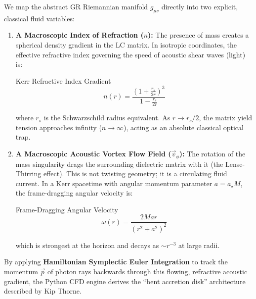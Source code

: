We map the abstract GR Riemannian manifold $g_{\mu\nu}$ directly into two explicit, classical fluid variables:
\begin{enumerate}
    \item \textbf{A Macroscopic Index of Refraction ($n$):} The presence of mass creates a spherical density gradient in the LC matrix. In isotropic coordinates, the effective refractive index governing the speed of acoustic shear waves (light) is:
    \begin{resultbox}{Kerr Refractive Index Gradient}
\begin{equation}
        n(r) = \frac{\left(1 + \frac{r_s}{2r}\right)^3}{1 - \frac{r_s}{2r}}
\end{equation}
\end{resultbox}
    where $r_s$ is the Schwarzschild radius equivalent. As $r \to r_s/2$, the matrix yield tension approaches infinity ($n \to \infty$), acting as an absolute classical optical trap.
    
    \item \textbf{A Macroscopic Acoustic Vortex Flow Field ($\vec{v}_\phi$):} The rotation of the mass singularity drags the surrounding dielectric matrix with it (the Lense-Thirring effect). This is not twisting geometry; it is a circulating fluid current. In a Kerr spacetime with angular momentum parameter $a = a_\star M$, the frame-dragging angular velocity is:
    \begin{resultbox}{Frame-Dragging Angular Velocity}
\begin{equation}
        \omega(r) = \frac{2Mar}{(r^2 + a^2)^2}
\end{equation}
\end{resultbox}
    which is strongest at the horizon and decays as $\sim r^{-3}$ at large radii.
\end{enumerate}

By applying \textbf{Hamiltonian Symplectic Euler Integration} to track the momentum $\vec{p}$ of photon rays backwards through this flowing, refractive acoustic gradient, the Python CFD engine derives the ``bent accretion disk'' architecture described by Kip Thorne.

